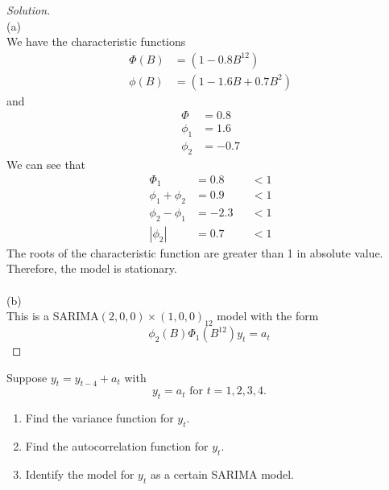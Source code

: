 \documentclass[UTF8,a4paper,14pt]{ctexart}
\newenvironment{solution}
  {\renewcommand\qedsymbol{$\blacksquare$}\begin{proof}[Solution]}
  {\end{proof}}
\theoremstyle{definition}
\theoremstyle{remark}
\begin{document}
\begin{solution}\,\\
  (a)\\
  We have the characteristic functions
  \begin{equation}\
    \begin{aligned}
      \Phi(B) &= (1-0.8B^{12})\\
      \phi(B) &= (1-1.6B+0.7B^2)
    \end{aligned}
  \end{equation}
  and
  \begin{equation}\
    \begin{aligned}
      \Phi &= 0.8\\
      \phi_1 &= 1.6\\
      \phi_2 &=-0.7
    \end{aligned}
  \end{equation}
We can see that
  \begin{equation}\
    \begin{aligned}
      \Phi_1 &= 0.8 &&< 1\\
      \phi_1 + \phi_2 &= 0.9 &&< 1\\
      \phi_2 - \phi_1 &=-2.3 &&< 1\\
      \left\lvert \phi_2\right\rvert  &= 0.7 &&<1
    \end{aligned}
  \end{equation}
  The roots of the characteristic function are greater than 1 in absolute value. Therefore, the model is stationary.\\
  \\
  (b)\\
  This is a SARIMA\((2,0,0)\times(1,0,0)_{12}\) model with the form
  \[\phi_{2}(B)\Phi_{1}(B^{12})y_t = a_t
  \]


\end{solution}
\pagebreak

\begin{Problem}{}
  Suppose \(y_t=y_{t-4}+a_t\) with 
  \[y_t=a_t \text{ for }t=1,2,3,4.\]
  \begin{enumerate}[label=(\alph*)]
    \item Find the variance function for \(y_t\).
    \item Find the autocorrelation function for \(y_t\).
    \item Identify the model for \(y_t\) as a certain SARIMA model.
    \end{enumerate}
\end{Problem}
\end{document}
